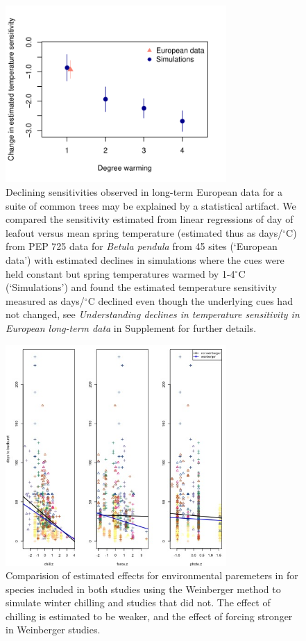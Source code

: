 \documentclass{article}
\begin{document}
\newpage
\begin{figure}[h!]
\centering
\noindent \includegraphics[width=0.75\textwidth]{..//..//analyses/bb_analysis/PEP_climate/figures/peprealandsims.pdf}
\caption{Declining sensitivities observed in long-term European data for a suite of common trees may be explained by a statistical artifact. We compared the sensitivity estimated from linear regressions of day of leafout versus mean spring temperature (estimated thus as days/$^{\circ}$C) from PEP 725 data for \emph{Betula pendula} from 45 sites (`European data') with estimated declines in simulations where the cues were held constant but spring temperatures warmed by 1-4$^{\circ}$C (`Simulations') and found the estimated temperature sensitivity measured as days/$^{\circ}$C declined even though the underlying cues had not changed, see \emph{Understanding declines in temperature sensitivity in European long-term data} in Supplement for further details.}
\label{fig:pepsims}
\end{figure}

\newpage
\begin{figure}[h!]
\centering
\noindent \includegraphics[width=0.75\textwidth]{..//..//analyses/figures/weinberger4supp.jpeg}
\caption{Comparision of estimated effects for environmental paremeters in for species included in both studies using the Weinberger method to simulate winter chilling and studies that did not. The effect of chilling is estimated to be weaker, and the effect of forcing stronger in Weinberger studies.}
\label{fig:weinberger}
\end{figure}
\end{document}
